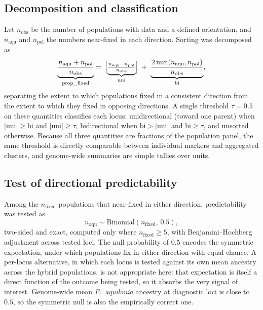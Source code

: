 \documentclass[11pt]{article}
\newcommand{\Faq}{\textit{F.~aquilonia}}
\begin{document}
\subsection{Decomposition and classification}
Let $n_{\mathrm{obs}}$ be the number of populations with data and a defined
orientation, and $n_{\mathrm{aqu}}$ and $n_{\mathrm{pol}}$ the numbers near-fixed
in each direction. Sorting was decomposed as
\begin{equation}
\underbrace{\frac{n_{\mathrm{aqu}}+n_{\mathrm{pol}}}{n_{\mathrm{obs}}}}_{\text{prop\_fixed}}
=\;\Bigl|\underbrace{\tfrac{n_{\mathrm{aqu}}-n_{\mathrm{pol}}}{n_{\mathrm{obs}}}}_{\text{uni}}\Bigr|
\;+\;\underbrace{\frac{2\min(n_{\mathrm{aqu}},n_{\mathrm{pol}})}{n_{\mathrm{obs}}}}_{\text{bi}} ,
\end{equation}
separating the extent to which populations fixed in a consistent direction from
the extent to which they fixed in opposing directions. A single threshold
$\tau = 0.5$ on these quantities classifies each locus: unidirectional (toward
one parent) when $|\mathrm{uni}| \ge \mathrm{bi}$ and $|\mathrm{uni}| \ge \tau$,
bidirectional when $\mathrm{bi} > |\mathrm{uni}|$ and $\mathrm{bi} \ge \tau$, and
unsorted otherwise. Because all three quantities are fractions of the population
panel, the same threshold is directly comparable between individual markers and
aggregated clusters, and genome-wide summaries are simple tallies over units.

\subsection{Test of directional predictability}
Among the $n_{\mathrm{fixed}}$ populations that near-fixed in either direction,
predictability was tested as
\begin{equation}
n_{\mathrm{aqu}} \sim \mathrm{Binomial}(n_{\mathrm{fixed}},\, 0.5),
\end{equation}
two-sided and exact, computed only where $n_{\mathrm{fixed}} \ge 5$, with
Benjamini--Hochberg adjustment across tested loci. The null probability of $0.5$
encodes the symmetric expectation, under which populations fix in either
direction with equal chance. A per-locus alternative, in which each locus is
tested against its own mean ancestry across the hybrid populations, is not
appropriate here: that expectation is itself a direct function of the outcome
being tested, so it absorbs the very signal of interest. Genome-wide mean \Faq{}
ancestry at diagnostic loci is close to $0.5$, so the symmetric null is also the
empirically correct one.
\end{document}
